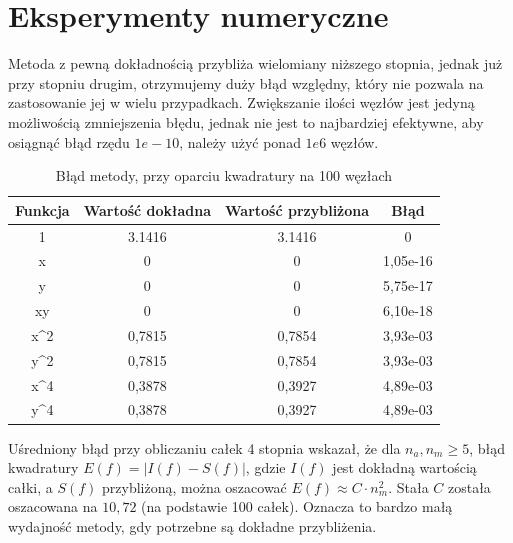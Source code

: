 \documentclass[a4paper,12pt]{article}
\begin{document}
\section*{Eksperymenty numeryczne}
    Metoda z pewną dokładnością przybliża wielomiany niższego stopnia, jednak już przy stopniu drugim, otrzymujemy duży błąd względny, który nie pozwala na zastosowanie jej w wielu przypadkach. Zwiększanie ilości węzłów jest jedyną możliwością zmniejszenia błędu, jednak nie jest to najbardziej efektywne, aby osiągnąć błąd rzędu $1e-10$, należy użyć ponad $1e6$ węzłów.
\begin{table}[h]
\centering
\begin{tabular}{|c|c|c|c|}
\hline
Funkcja              & Wartość dokładna & Wartość przybliżona & Błąd     \\ \hline
1                    & 3.1416           & 3.1416              & 0        \\ \hline
x                    & 0                & 0                   & 1,05e-16 \\ \hline
y                    & 0                & 0                   & 5,75e-17 \\ \hline
xy                   & 0                & 0                   & 6,10e-18 \\ \hline
x\textasciicircum{}2 & 0,7815           & 0,7854              & 3,93e-03 \\ \hline
y\textasciicircum{}2 & 0,7815           & 0,7854              & 3,93e-03 \\ \hline
x\textasciicircum{}4 & 0,3878           & 0,3927              & 4,89e-03 \\ \hline
y\textasciicircum{}4 & 0,3878           & 0,3927              & 4,89e-03 \\ \hline
\end{tabular}
\caption{Błąd metody, przy oparciu kwadratury na 100 węzłach}
\end{table}

\break

    Uśredniony błąd przy obliczaniu całek 4 stopnia wskazał, że dla $n_a,n_m\geq 5$, błąd kwadratury $E(f)=|I(f)-S(f)|$, gdzie $I(f)$ jest dokładną wartością całki, a $S(f)$ przybliżoną, można oszacować $E(f)\approx C\cdot n_m^2$. Stała $C$ została oszacowana na $10,72$ (na podstawie 100 całek). Oznacza to bardzo małą wydajność metody, gdy potrzebne są dokładne przybliżenia.
    
\end{document}
